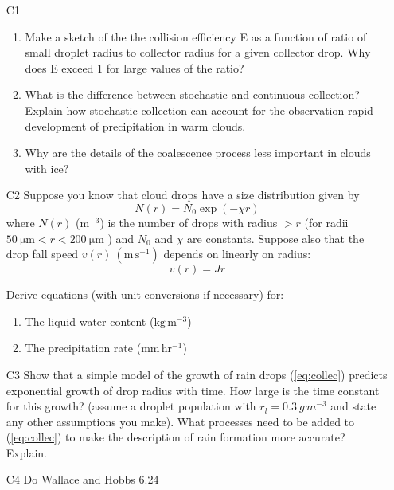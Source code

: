 \documentclass[12pt]{article}
\begin{document}
\begin{enumerate}

\item[C1] 

  \begin{enumerate}
  \item Make a sketch of the the collision efficiency E as a function
    of ratio of small droplet radius to collector radius for a given
    collector drop.  Why does E exceed 1 for large values of the
    ratio?
  \item What is the difference between stochastic and continuous
    collection? Explain how stochastic collection can account for the
    observation rapid development of precipitation in warm clouds.
  \item Why are the details of the coalescence process less important
    in clouds with ice?
  \end{enumerate}


\item[C2] Suppose you know that cloud drops have a size distribution given
  by 
  \begin{equation}
    \label{marshall}
    N(r)=N_0 \exp (- \chi r)
  \end{equation}
\noindent
where $N(r)$ ($\mathrm m^{-3}$) is the number of drops with radius $>
r$ (for radii $50\ \mathrm{\mu m} < r < 200\ \mathrm{\mu m}$ ) and $N_0$
and $\chi$ are constants.  Suppose also that the drop fall speed
$v(r)\ (\mathrm{m\,s^{-1}})$ 
depends on linearly on radius:
\begin{equation}
  \label{fallspeed}
  v(r)=Jr
\end{equation}

Derive equations (with unit conversions if necessary) for:

\begin{enumerate}
\item The liquid water content ($\mathrm{kg\,m^{-3}}$)
\item The precipitation rate ($\mathrm{mm\,hr^{-1}}$)
\end{enumerate}


\item[C3] Show that a simple model of the growth of rain drops
    (\ref{eq:collec}) predicts exponential growth of drop radius with
    time.  How large is the time constant for this growth? (assume a
    droplet population with $r_l = 0.3\ g\,m^{-3}$ and state any other
    assumptions you make).  What processes need to be added to
    (\ref{eq:collec}) to make the description of rain formation more
    accurate? Explain.



  \item[C4]  Do Wallace and Hobbs 6.24

\end{enumerate}
\end{document}
